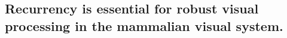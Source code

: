 \documentclass[12pt]{article}
\begin{document}






\subsection{Recurrency is essential for robust visual processing in the mammalian visual system.}
\end{document}
